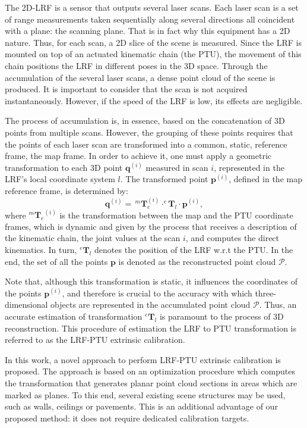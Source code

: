 \documentclass[conference]{IEEEtran}
\begin{document}
The 2D-LRF is a sensor that outputs several laser scans. Each laser scan is a set of range measurements taken sequentially along several directions all coincident with a plane: the scanning plane. That is in fact why this equipment has a 2D nature. Thus, for each scan, a 2D slice of the scene is measured. Since the LRF is mounted on top of an actuated kinematic chain (the PTU), the movement of this chain positions the LRF in different poses in the 3D space. Through the accumulation of the several laser scans, a dense point cloud of the scene is produced. It is important to consider that the scan is not acquired instantaneously. However, if the speed of the LRF is low, its effects are negligible.

The process of accumulation is, in essence, based on the concatenation of 3D points from multiple scans. However, the grouping of these points requires that the points of each laser scan are transformed into a common, static, reference frame, the map frame. In order to achieve it, one must apply a geometric transformation to each 3D point $\mathbf{q}^{(i)}$ measured in scan $i$, represented in the LRF's local coordinate system $l$. The transformed point $\mathbf{p}^{(i)}$, defined in the map reference frame, is determined by:
%
\begin{equation}\label{equation:point-reconstruction}
    \mathbf{q}^{(i)} = \, ^{m}\mathbf{T}_{e}^{(i)} \cdot ^{e}\mathbf{T}_{l} \cdot \mathbf{p}^{(i)},
\end{equation}
%
\noindent where ${^{m}\mathbf{T}_{e}}^{(i)}$ is the transformation between the map and the PTU coordinate frames, which is dynamic and given by the process that receives a description of the kinematic chain, the joint values at the scan $i$, and computes the direct kinematics. In turn, $^{e}\mathbf{T}_{l}$ denotes the position of the LRF w.r.t the PTU. In the end, the set of all the points $\mathbf{p}$ is denoted as the reconstructed point cloud $\mathcal{P}$.

Note that, although this transformation is static, it influences the coordinates of the points $\mathbf{p}^{(i)}$, and therefore is crucial to the accuracy with which three-dimensional objects are represented in the accumulated point cloud $\mathcal{P}$.
Thus, an accurate estimation of transformation $^{e}\mathbf{T}_{l}$ is paramount to the process of 3D reconstruction. This procedure of estimation the LRF to PTU transformation is referred to as the LRF-PTU extrinsic calibration.

In this work, a novel approach to perform LRF-PTU extrinsic calibration is proposed. The approach is based on an optimization procedure which computes the transformation that generates planar point cloud sections in areas which are marked as planes. To this end, several existing scene structures may be used, such as walls, ceilings or pavements. This is an additional advantage of our proposed method: it does not require dedicated calibration targets.
\end{document}
